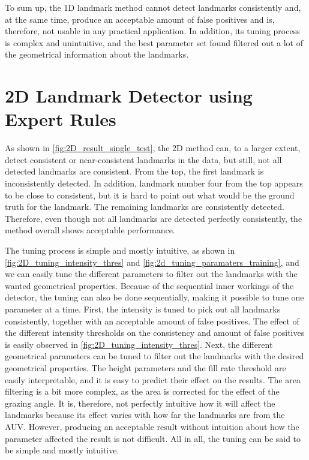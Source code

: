 To sum up, the 1D landmark method cannot detect landmarks consistently and, at the same time, produce an acceptable amount of false positives and is, therefore, not usable in any practical application. In addition, its tuning process is complex and unintuitive, and the best parameter set found filtered out a lot of the geometrical information about the landmarks. 

\section{2D Landmark Detector using Expert Rules}

As shown in \cref{fig:2D_result_single_test}, the 2D method can, to a larger extent, detect consistent or near-consistent landmarks in the data, but still, not all detected landmarks are consistent. From the top, the first landmark is inconsistently detected. In addition, landmark number four from the top appears to be close to consistent, but it is hard to point out what would be the ground truth for the landmark. The remaining landmarks are consistently detected. Therefore, even though not all landmarks are detected perfectly consistently, the method overall shows acceptable performance.

The tuning process is simple and mostly intuitive, as shown in \cref{fig:2D_tuning_intensity_thres} and \cref{fig:2d_tuning_paramaters_training}, and we can easily tune the different parameters to filter out the landmarks with the wanted geometrical properties. Because of the sequential inner workings of the detector, the tuning can also be done sequentially, making it possible to tune one parameter at a time. First, the intensity is tuned to pick out all landmarks consistently, together with an acceptable amount of false positives. The effect of the different intensity thresholds on the consistency and amount of false positives is easily observed in \cref{fig:2D_tuning_intensity_thres}. Next, the different geometrical parameters can be tuned to filter out the landmarks with the desired geometrical properties. The height parameters and the fill rate threshold are easily interpretable, and it is easy to predict their effect on the results. The area filtering is a bit more complex, as the area is corrected for the effect of the grazing angle. It is, therefore, not perfectly intuitive how it will affect the landmarks because its effect varies with how far the landmarks are from the AUV. However, producing an acceptable result without intuition about how the parameter affected the result is not difficult. All in all, the tuning can be said to be simple and mostly intuitive. 

